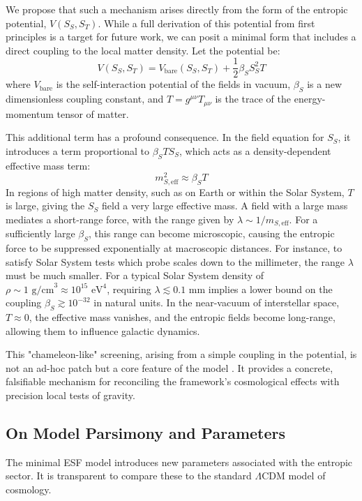 \documentclass[12pt, a4paper]{article}
\begin{document}
We propose that such a mechanism arises directly from the form of the entropic potential, \(V(S_S, S_T)\). While a full derivation of this potential from first principles is a target for future work, we can posit a minimal form that includes a direct coupling to the local matter density. Let the potential be:
\begin{equation}
V(S_S, S_T) = V_{\text{bare}}(S_S, S_T) + \frac{1}{2} \beta_S S_S^2 T
\end{equation}
where \(V_{\text{bare}}\) is the self-interaction potential of the fields in vacuum, \(\beta_S\) is a new dimensionless coupling constant, and \(T = g^{\mu\nu}T_{\mu\nu}\) is the trace of the energy-momentum tensor of matter.

This additional term has a profound consequence. In the field equation for \(S_S\), it introduces a term proportional to \(\beta_S T S_S\), which acts as a density-dependent effective mass term:
\[ m_{S,\text{eff}}^2 \approx \beta_S T \]
In regions of high matter density, such as on Earth or within the Solar System, \(T\) is large, giving the \(S_S\) field a very large effective mass. A field with a large mass mediates a short-range force, with the range given by \(\lambda \sim 1/m_{S,\text{eff}}\). For a sufficiently large \(\beta_S\), this range can become microscopic, causing the entropic force to be suppressed exponentially at macroscopic distances. For instance, to satisfy Solar System tests which probe scales down to the millimeter, the range \(\lambda\) must be much smaller. For a typical Solar System density of \(\rho \sim 1 \text{ g/cm}^3 \approx 10^{15} \text{ eV}^4\), requiring \(\lambda \lesssim 0.1 \text{ mm}\) implies a lower bound on the coupling \(\beta_S \gtrsim 10^{-32}\) in natural units. In the near-vacuum of interstellar space, \(T \approx 0\), the effective mass vanishes, and the entropic fields become long-range, allowing them to influence galactic dynamics.

This "chameleon-like" screening, arising from a simple coupling in the potential, is not an ad-hoc patch but a core feature of the model \cite{Khoury2004}. It provides a concrete, falsifiable mechanism for reconciling the framework's cosmological effects with precision local tests of gravity.

\subsection{On Model Parsimony and Parameters}
\label{sec:parsimony}
The minimal ESF model introduces new parameters associated with the entropic sector. It is transparent to compare these to the standard \(\Lambda\)CDM model of cosmology.
\end{document}
